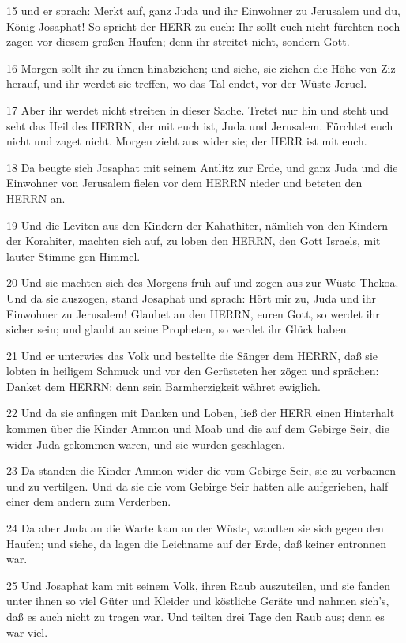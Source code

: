 \par 15 und er sprach: Merkt auf, ganz Juda und ihr Einwohner zu Jerusalem und du, König Josaphat! So spricht der HERR zu euch: Ihr sollt euch nicht fürchten noch zagen vor diesem großen Haufen; denn ihr streitet nicht, sondern Gott.
\par 16 Morgen sollt ihr zu ihnen hinabziehen; und siehe, sie ziehen die Höhe von Ziz herauf, und ihr werdet sie treffen, wo das Tal endet, vor der Wüste Jeruel.
\par 17 Aber ihr werdet nicht streiten in dieser Sache. Tretet nur hin und steht und seht das Heil des HERRN, der mit euch ist, Juda und Jerusalem. Fürchtet euch nicht und zaget nicht. Morgen zieht aus wider sie; der HERR ist mit euch.
\par 18 Da beugte sich Josaphat mit seinem Antlitz zur Erde, und ganz Juda und die Einwohner von Jerusalem fielen vor dem HERRN nieder und beteten den HERRN an.
\par 19 Und die Leviten aus den Kindern der Kahathiter, nämlich von den Kindern der Korahiter, machten sich auf, zu loben den HERRN, den Gott Israels, mit lauter Stimme gen Himmel.
\par 20 Und sie machten sich des Morgens früh auf und zogen aus zur Wüste Thekoa. Und da sie auszogen, stand Josaphat und sprach: Hört mir zu, Juda und ihr Einwohner zu Jerusalem! Glaubet an den HERRN, euren Gott, so werdet ihr sicher sein; und glaubt an seine Propheten, so werdet ihr Glück haben.
\par 21 Und er unterwies das Volk und bestellte die Sänger dem HERRN, daß sie lobten in heiligem Schmuck und vor den Gerüsteten her zögen und sprächen: Danket dem HERRN; denn sein Barmherzigkeit währet ewiglich.
\par 22 Und da sie anfingen mit Danken und Loben, ließ der HERR einen Hinterhalt kommen über die Kinder Ammon und Moab und die auf dem Gebirge Seir, die wider Juda gekommen waren, und sie wurden geschlagen.
\par 23 Da standen die Kinder Ammon wider die vom Gebirge Seir, sie zu verbannen und zu vertilgen. Und da sie die vom Gebirge Seir hatten alle aufgerieben, half einer dem andern zum Verderben.
\par 24 Da aber Juda an die Warte kam an der Wüste, wandten sie sich gegen den Haufen; und siehe, da lagen die Leichname auf der Erde, daß keiner entronnen war.
\par 25 Und Josaphat kam mit seinem Volk, ihren Raub auszuteilen, und sie fanden unter ihnen so viel Güter und Kleider und köstliche Geräte und nahmen sich's, daß es auch nicht zu tragen war. Und teilten drei Tage den Raub aus; denn es war viel.
